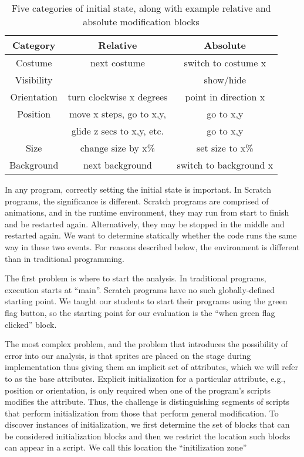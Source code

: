 \begin{table}
\centering
{\arialnarrowsm %
\begin{tabular}{|c|c|c|} \hline
Category & Relative&Absolute\\ \hline \hline
Costume& next costume & switch to costume x\\ \hline
Visibility& & show/hide\\ \hline
Orientation&turn clockwise x degrees&point in direction x\\ \hline
Position&move x steps, go to x,y,&go to x,y\\
&glide z secs to x,y, etc.&go to x,y\\ \hline
Size&change size by x\% & set size to x\%\\ \hline
Background&next background & switch to background x\\ \hline
\end{tabular}
}%
\caption{Five categories of initial state, along with example relative and
  absolute modification blocks}
\end{table}


In any program, correctly setting the initial state is important.  In Scratch
programs, the significance is different.  Scratch programs are comprised of
animations, and in the runtime environment, they may run from start to finish
and be restarted again.  Alternatively, they may be stopped in the middle and
restarted again.  We want to determine statically whether the code runs the
same way in these two events.  For reasons described below, the environment is
different than in traditional programming.

The first problem is where to start the analysis.  In traditional programs,
execution starts at ``main''.  Scratch programs have no such globally-defined
starting point.  We taught our students to start their programs using the green
flag button, so the starting point for our evaluation is the ``when green flag
clicked'' block.

The most complex problem, and the problem that introduces the possibility of
error into our analysis, is that sprites are placed on the stage during
implementation thus giving them an implicit set of attributes, which we will
refer to as the base attributes. Explicit initialization for a particular
attribute, e.g., position or orientation, is only required when one of the
program's scripts modifies the attribute. Thus, the challenge is distinguishing
segments of scripts that perform initialization from those that perform general
modification. To discover instances of initialization, we first determine the
set of blocks that can be considered initialization blocks and then we restrict
the location such blocks can appear in a script. We call this location the
``initilization zone''

